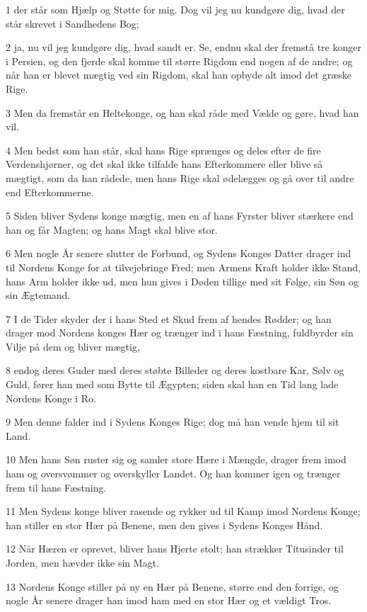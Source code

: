 \par 1 der står som Hjælp og Støtte for mig. Dog vil jeg nu kundgøre dig, hvad der står skrevet i Sandhedens Bog;
\par 2 ja, nu vil jeg kundgøre dig, hvad sandt er. Se, endnu skal der fremstå tre konger i Persien, og den fjerde skal komme til større Rigdom end nogen af de andre; og når han er blevet mægtig ved sin Rigdom, skal han opbyde alt imod det græske Rige.
\par 3 Men da fremstår en Heltekonge, og han skal råde med Vælde og gøre, hvad han vil.
\par 4 Men bedst som han står, skal hans Rige sprænges og deles efter de fire Verdenshjørner, og det skal ikke tilfalde hans Efterkommere eller blive så mægtigt, som da han rådede, men hans Rige skal ødelægges og gå over til andre end Efterkommerne.
\par 5 Siden bliver Sydens konge mægtig, men en af hans Fyrster bliver stærkere end han og får Magten; og hans Magt skal blive stor.
\par 6 Men nogle År senere slutter de Forbund, og Sydens Konges Datter drager ind til Nordens Konge for at tilvejebringe Fred; men Armens Kraft holder ikke Stand, hans Arm holder ikke ud, men hun gives i Døden tillige med sit Følge, sin Søn og sin Ægtemand.
\par 7 I de Tider skyder der i hans Sted et Skud frem af hendes Rødder; og han drager mod Nordens konges Hær og trænger ind i hans Fæstning, fuldbyrder sin Vilje på dem og bliver mægtig,
\par 8 endog deres Guder med deres støbte Billeder og deres kostbare Kar, Sølv og Guld, fører han med som Bytte til Ægypten; siden skal han en Tid lang lade Nordens Konge i Ro.
\par 9 Men denne falder ind i Sydens Konges Rige; dog må han vende hjem til sit Land.
\par 10 Men hans Søn ruster sig og samler store Hære i Mængde, drager frem imod ham og oversvømmer og overskyller Landet. Og han kommer igen og trænger frem til hans Fæstning.
\par 11 Men Sydens konge bliver rasende og rykker ud til Kamp imod Nordens Konge; han stiller en stor Hær på Benene, men den gives i Sydens Konges Hånd.
\par 12 Når Hæren er oprevet, bliver hans Hjerte stolt; han strækker Titusinder til Jorden, men hævder ikke sin Magt.
\par 13 Nordens Konge stiller på ny en Hær på Benene, større end den forrige, og nogle År senere drager han imod ham med en stor Hær og et vældigt Tros.
